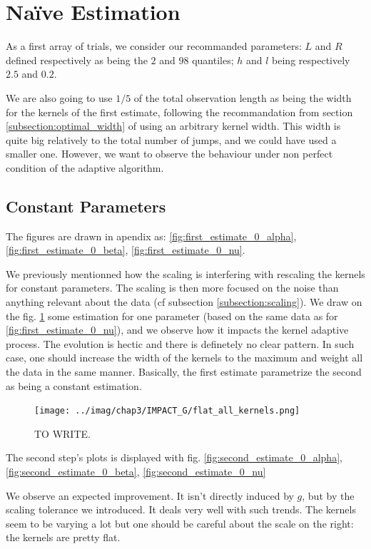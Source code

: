 \documentclass[11pt]{book}
\begin{document}
\section{Naïve Estimation}
As a first array of trials, we consider our recommanded parameters: $L$ and $R$ defined respectively as being the $2$ and $98$ quantiles; $h$ and $l$ being respectively $2.5$ and $0.2$. 

We are also going to use $1/5$ of the total observation length as being the width for the kernels of the first estimate, following the recommandation from section \ref{subsection:optimal_width} of using an arbitrary kernel width. This width is quite big relatively to the total number of jumps, and we could have used a smaller one. However, we want to observe the behaviour under non perfect condition of the adaptive algorithm.

\subsection{Constant Parameters}
The figures are drawn in apendix as: \ref{fig:first_estimate_0_alpha}, \ref{fig:first_estimate_0_beta}, \ref{fig:first_estimate_0_nu}. 


We previously mentionned how the scaling is interfering with rescaling the kernels for constant parameters. The scaling is then more focused on the noise than anything relevant about the data (cf subsection \ref{subsection:scaling}). We draw on the fig. \ref{fig:impact_g_flat} some estimation for one parameter (based on the same data as for \ref{fig:first_estimate_0_nu}), and we observe how it impacts the kernel adaptive process. The evolution is hectic and there is definetely no clear pattern. In such case, one should increase the width of the kernels to the maximum and weight all the data in the same manner. Basically, the first estimate parametrize the second as being a constant estimation. 

\begin{figure}
\centering
\texttt{[image: ../imag/chap3/IMPACT\_G/flat\_all\_kernels.png]}
\caption{TO WRITE.}
\label{fig:impact_g_flat}
\end{figure}

The second step's plots is displayed with fig. \ref{fig:second_estimate_0_alpha}, \ref{fig:second_estimate_0_beta}, \ref{fig:second_estimate_0_nu}

We observe an expected improvement. It isn't directly induced by $g$, but by the scaling tolerance we introduced. It deals very well with such trends. The kernels seem to be varying a lot but one should be careful about the scale on the right: the kernels are pretty flat.
\end{document}
